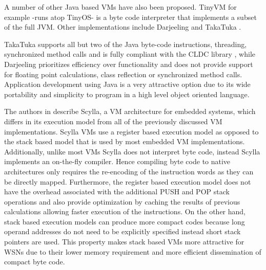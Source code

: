 A number of other Java based VMs have also been proposed. TinyVM \cite{hong2009tinyvm} for example -runs atop TinyOS- is a byte code interpreter that implements a subset of the full JVM. Other implementations include Darjeeling \cite{Brouwers:2009:DFV:1644038.1644056}  and TakaTuka \cite{Aslam:2008:ITJ:1460412.1460472}.  

TakaTuka supports all but two of the Java byte-code instructions, threading, synchronized method calls and is fully compliant with the CLDC library \cite{debbabi2006security}, while Darjeeling prioritizes efficiency over functionality and does not provide support for floating point calculations, class reflection or synchronized method calls. 
Application development using Java is a very attractive option due to its wide portability and simplicity to program in a high level object oriented language.

The authors in \cite{895380} describe Scylla, a VM architecture for embedded systems, which differs in its execution model from all of the previously discussed VM implementations. Scylla VMs use a register based execution model as opposed to the stack based model that is used by most embedded VM implementations. Additionally, unlike most VMs Scylla does not interpret byte code, instead Scylla implements an on-the-fly compiler. Hence compiling byte code to native architectures only requires the re-encoding of the instruction words as they can be directly mapped. Furthermore, the register based execution model does not have the overhead associated with the additional PUSH and POP stack operations and also provide optimization by caching the results of previous calculations allowing faster execution of the instructions. On the other hand, stack based execution models can produce more compact codes because long operand addresses do not need to be explicitly specified instead short stack pointers are used. This property makes stack based VMs more attractive for WSNs due to their lower memory requirement and more efficient dissemination of compact byte code. 